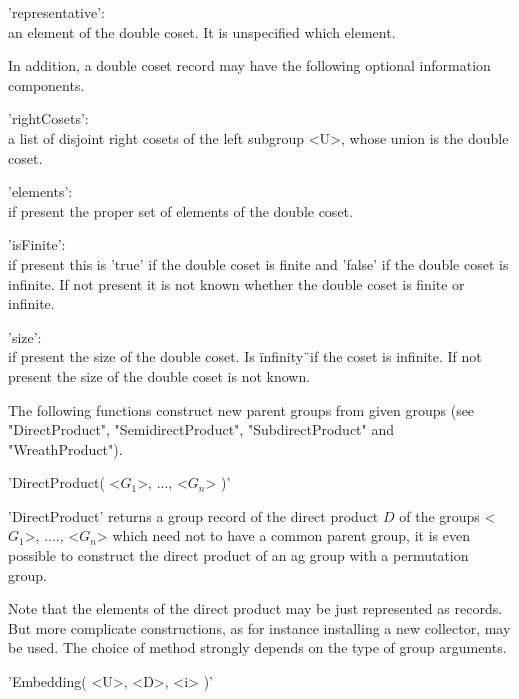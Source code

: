 'representative': \\
        an element of the double coset.  It is unspecified which element.

In  addition,  a double  coset  record  may have the   following optional
information components.

'rightCosets': \\
        a  list  of disjoint  right  cosets of the   left  subgroup  <U>,
        whose union is the double coset.

'elements': \\
        if present the proper set of elements of the double coset.

'isFinite': \\
        if present this  is 'true' if  the  double coset   is finite  and
        'false' if the  double coset is  infinite.  If not present it  is
        not known whether the double coset is finite or infinite.

'size': \\
        if present the size of the double coset.  Is \"infinity\"\ if the
        coset is infinite.  If not present the  size  of the double coset
        is not known.



The  following  functions construct new  parent  groups from given groups
(see    "DirectProduct",  "SemidirectProduct",    "SubdirectProduct"  and
"WreathProduct").

%

'DirectProduct( <$G_1$>, ..., <$G_n$> )'

'DirectProduct' returns a group record  of the direct  product $D$ of the
groups <$G_1$>, ....,  <$G_n$> which need not  to have  a  common  parent
group, it is even possible to construct the direct product of an ag group
with a permutation group.

Note that the elements of the direct product  may be just  represented as
records.  But more complicate constructions, as for instance installing a
new collector, may be used.  The choice of method strongly depends on the
type of group arguments.

\vspace{5mm}
'Embedding( <U>, <D>, <i> )'

